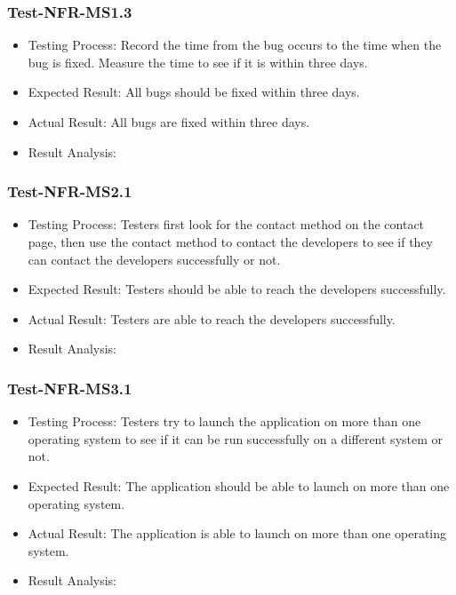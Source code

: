 \documentclass[12pt, titlepage]{article}
\begin{document}
\subsubsection{Test-NFR-MS1.3}
\begin{itemize}
    \item Testing Process: Record the time from the bug occurs to the time when the bug
is fixed. Measure the time to see if it is within three days.
    \item Expected Result: All bugs should be fixed within three days.
    \item Actual Result: All bugs are fixed within three days.
    \item Result Analysis: \pass
\end{itemize}


\subsubsection{Test-NFR-MS2.1}
\begin{itemize}
    \item Testing Process: Testers first look for the contact method on the contact page,
then use the contact method to contact the developers to see if they can contact the developers
successfully or not.
    \item Expected Result: Testers should be able to reach the developers successfully.
    \item Actual Result: Testers are able to reach the developers successfully.
    \item Result Analysis: \pass
\end{itemize}


\subsubsection{Test-NFR-MS3.1}
\begin{itemize}
    \item Testing Process:  Testers try to launch the application on more than one operating
system to see if it can be run successfully on a different system or not.
    \item Expected Result: The application should be able to launch on more than one operating system. 
    \item Actual Result: The application is able to launch on more than one operating system. 
    \item Result Analysis: \pass
\end{itemize}
\end{document}
